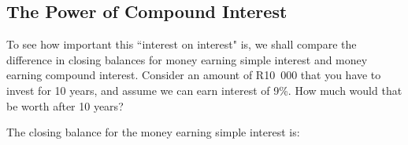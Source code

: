             \subsection{ The Power of Compound Interest}
            \nopagebreak
            
        
        \label{m39334*id73519}To see how important this ``interest on interest" is, we shall compare the difference in closing balances for money earning simple interest and money earning compound interest. Consider an amount of R10~000 that you have to invest for 10 years, and assume we can earn interest of 9\%. How much would that be worth after 10 years?\par 
        \label{m39334*id73528}The closing balance for the money earning simple interest is:\par 
        \label{m39334*id73532}\nopagebreak\noindent{}
    
